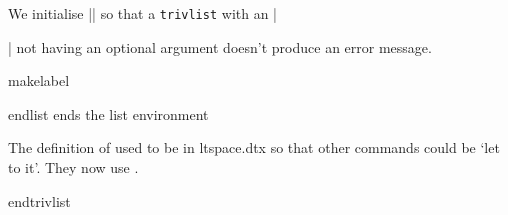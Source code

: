 \begin{texcode}{}{}
    We initialise |\@itemlabel| so that a \texttt{trivlist} with
    an |\item| not having an optional argument doesn't produce an
    error message.

 \begin{docCommand} {makelabel} {}
 \end{docCommand}
    \begin{teX}
  \let\@itemlabel\@empty
  \def\makelabel##1{##1}}
    \end{teX}


 \begin{docCommand}{endlist} {  }
  ends the list environment
 \end{docCommand}
     \begin{teX}
\def\endlist{%
  \global\advance\@listdepth\m@ne
  \endtrivlist}
    \end{teX}
 

    The definition of  used to be in ltspace.dtx 
    so that other commands could be `let to it'.  
    They now use .
 \begin{docCommand}{endtrivlist}{}
 \end{docCommand}
 
    \begin{teX}
\def\endtrivlist{%
  \if@inlabel
    \leavevmode
    \global \@inlabelfalse
  \fi
  \if@newlist
    \@noitemerr
    \global \@newlistfalse
  \fi
  \ifhmode\unskip \par
    \end{teX}
    We also check if we are in math mode and issue an error message
    if so (hoping that |\@currenvir| resolves suitably). Otherwise
    the usual ``perhaps a missing item'' error will get triggered
    later which is confusing.
 \changes{v1.0s}{2002/10/28}{Check for math mode (pr/3437)}
    \begin{teX}
  \else
    \@inmatherr{\end{\@currenvir}}%
  \fi
  \if@noparlist \else
    \ifdim\lastskip >\z@
      \@tempskipa\lastskip \vskip -\lastskip
      \advance\@tempskipa\parskip \advance\@tempskipa -\@outerparskip
      \vskip\@tempskipa
    \fi
    \@endparenv
  \fi
}
    \end{teX}
 


\end{texcode}
